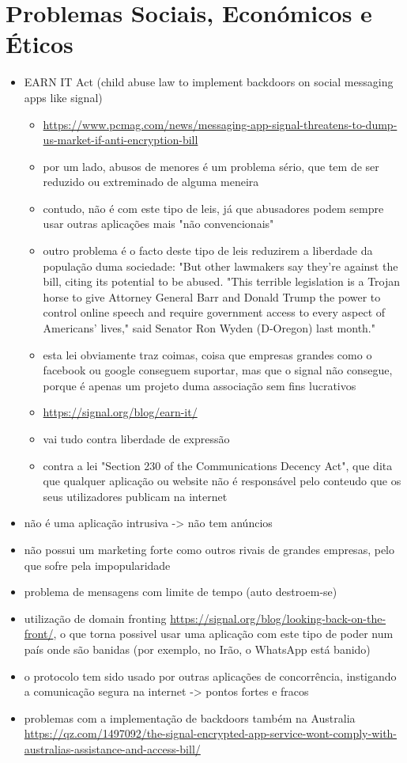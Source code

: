 \section{Problemas Sociais, Económicos e Éticos}


\begin{itemize}
   \item EARN IT Act (child abuse law to implement backdoors on social messaging apps like signal)
   \begin{itemize}
      \item \url{https://www.pcmag.com/news/messaging-app-signal-threatens-to-dump-us-market-if-anti-encryption-bill}
      \item por um lado, abusos de menores é um problema sério, que tem de ser reduzido ou extreminado de alguma meneira
      \item contudo, não é com este tipo de leis, já que abusadores podem sempre usar outras aplicações mais "não convencionais" 
      \item outro problema é o facto deste tipo de leis reduzirem a liberdade da população duma sociedade: "But other lawmakers say they're against the bill, citing its potential to be abused. "This terrible legislation is a Trojan horse to give Attorney General Barr and Donald Trump the power to control online speech and require government access to every aspect of Americans' lives," said Senator Ron Wyden (D-Oregon) last month."
      \item esta lei obviamente traz coimas, coisa que empresas grandes como o facebook ou google conseguem suportar, mas que o signal não consegue, porque é apenas um projeto duma associação sem fins lucrativos
      \item \url{https://signal.org/blog/earn-it/}
      \item vai tudo contra liberdade de expressão
      \item contra a lei "Section 230 of the Communications Decency Act", que dita que qualquer aplicação ou website não é responsável pelo conteudo que os seus utilizadores publicam na internet
   \end{itemize}
   \item não é uma aplicação intrusiva -> não tem anúncios
   \item não possui um marketing forte como outros rivais de grandes empresas, pelo que sofre pela impopularidade
   \item problema de mensagens com limite de tempo (auto destroem-se)
   \item utilização de domain fronting \url{https://signal.org/blog/looking-back-on-the-front/}, o que torna possivel usar uma aplicação com este tipo de poder num país onde são banidas (por exemplo, no Irão, o WhatsApp está banido)
   \item o protocolo tem sido usado por outras aplicações de concorrência, instigando a comunicação segura na internet -> pontos fortes e fracos
   \item problemas com a implementação de backdoors também na Australia \url{https://qz.com/1497092/the-signal-encrypted-app-service-wont-comply-with-australias-assistance-and-access-bill/}
\end{itemize}


